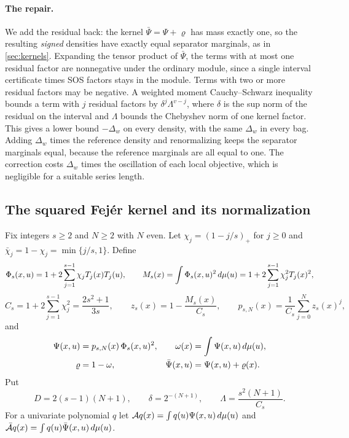\paragraph{The repair.}
We add the residual back: the kernel $\bar\Psi=\Psi+\varrho$ has mass
exactly one, so the resulting \emph{signed} densities have exactly equal
separator marginals, as in \cref{sec:kernels}. Expanding the tensor product
of $\bar\Psi$, the terms with at most one residual factor are nonnegative
under the ordinary module, since a single interval certificate times SOS
factors stays in the module. Terms with two or more residual factors may be
negative. A weighted moment Cauchy--Schwarz inequality bounds a term with
$j$ residual factors by $\delta^j\Lambda^{v-j}$, where $\delta$ is the sup
norm of the residual on the interval and $\Lambda$ bounds the Chebyshev
norm of one kernel factor. This gives a
lower bound $-\Delta_w$ on every density, with the same $\Delta_w$ in every
bag. Adding $\Delta_w$ times the reference density and renormalizing keeps
the separator marginals equal, because the reference marginals are all
equal to one. The correction costs $\Delta_w$ times the oscillation of each
local objective, which is negligible for a suitable series length.

\subsection{The squared Fejér kernel and its normalization}
\label{sec:mod-kernel}

Fix integers $s\ge2$ and $N\ge2$ with $N$ even. Let
$\chi_j=(1-j/s)_+$ for $j\ge0$ and $\bar\chi_j=1-\chi_j=\min\{j/s,1\}$.
Define
\begin{equation}\label{eq:mod-fejer}
  \Phi_s(x,u)=1+2\sum_{j=1}^{s-1}\chi_jT_j(x)T_j(u),\qquad
  M_s(x)=\int\Phi_s(x,u)^2\,d\mu(u)=1+2\sum_{j=1}^{s-1}\chi_j^2T_j(x)^2,
\end{equation}
\begin{equation}\label{eq:mod-constants}
  C_s=1+2\sum_{j=1}^{s-1}\chi_j^2=\frac{2s^2+1}{3s},\qquad
  z_s(x)=1-\frac{M_s(x)}{C_s},\qquad
  p_{s,N}(x)=\frac1{C_s}\sum_{j=0}^Nz_s(x)^j,
\end{equation}
and
\begin{equation}\label{eq:mod-kernel}
 \begin{aligned}
  \Psi(x,u)&=p_{s,N}(x)\,\Phi_s(x,u)^2,&
  \omega(x)&=\int\Psi(x,u)\,d\mu(u),\\
  \varrho&=1-\omega,&
  \bar\Psi(x,u)&=\Psi(x,u)+\varrho(x).
 \end{aligned}
\end{equation}
Put
\begin{equation}\label{eq:mod-D}
  D=2(s-1)(N+1),\qquad\delta=2^{-(N+1)},\qquad
  \Lambda=\frac{s^2(N+1)}{C_s}.
\end{equation}
For a univariate polynomial $q$ let $\mathcal Aq(x)=\int q(u)\Psi(x,u)\,d\mu(u)$
and $\bar{\mathcal A}q(x)=\int q(u)\bar\Psi(x,u)\,d\mu(u)$.

